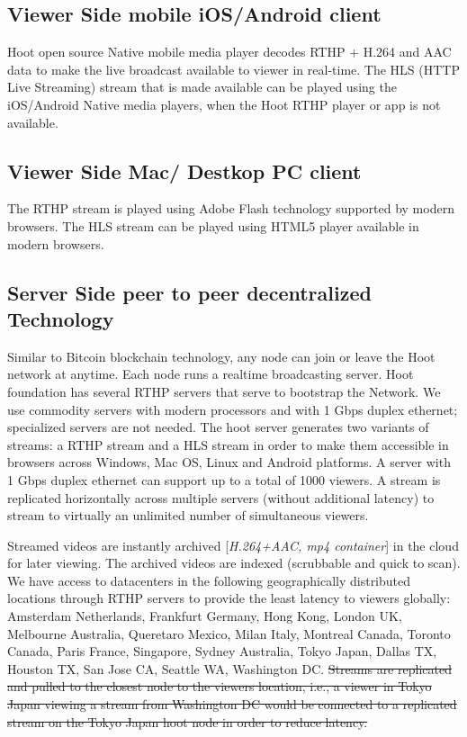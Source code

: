 \subsection{Viewer Side mobile iOS/Android client }
 Hoot open source Native mobile media player decodes RTHP + H.264 and AAC data to make the live broadcast available to viewer in real-time. The HLS (HTTP Live Streaming) stream that is made available can be played using the iOS/Android Native media players, when the Hoot RTHP player or app is not available.

\subsection{Viewer Side Mac/ Destkop PC client} 
The RTHP stream is played using Adobe Flash technology supported by modern browsers. The HLS stream can be played using HTML5 player available in modern browsers.

\subsection{Server Side peer to peer decentralized Technology}
Similar to Bitcoin blockchain technology, any node can join or leave the Hoot network at anytime. Each node runs a realtime broadcasting server.
Hoot foundation has several RTHP servers that serve to bootstrap the Network. We use commodity servers with modern processors and with 1 Gbps duplex ethernet; specialized servers are not needed. The hoot server generates two variants of streams: a RTHP stream and a HLS stream in order to make them accessible in browsers across Windows, Mac OS, Linux and Android platforms. A server with 1 Gbps duplex ethernet can support up to a total of 1000 viewers. A stream is replicated horizontally across multiple servers (without additional latency) to stream to virtually an unlimited number of simultaneous viewers. 

Streamed videos are instantly archived [\emph{H.264+AAC, mp4 container}] in the cloud for later viewing. The archived videos are indexed (scrubbable and quick to scan). We have access to datacenters in the following geographically distributed locations through RTHP servers to provide the least latency to viewers globally: Amsterdam Netherlands, Frankfurt Germany, Hong Kong, London UK, Melbourne Australia, Queretaro Mexico, Milan Italy, Montreal Canada, Toronto Canada, Paris France, Singapore, Sydney Australia, Tokyo Japan, Dallas TX, Houston TX, San Jose CA, Seattle WA, Washington DC. \sout{Streams are replicated and pulled to the closest node to the viewers location, i.e., a viewer in Tokyo Japan viewing a stream from Washington DC would be connected to a replicated stream on the Tokyo Japan hoot node in order to reduce latency.}

